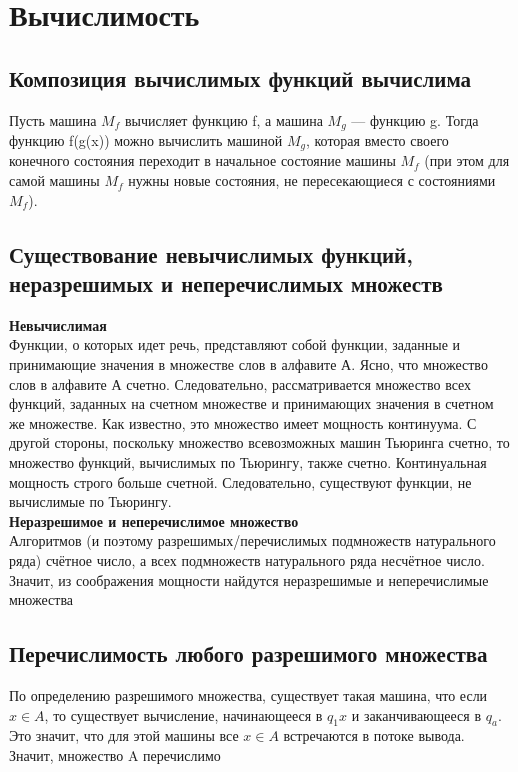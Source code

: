 \section{Вычислимость}

\subsection{Композиция вычислимых функций вычислима}
Пусть машина $M_f$ вычисляет функцию f, а машина $M_g$ — функцию g. Тогда функцию f(g(x)) можно вычислить машиной $M_g$, которая вместо своего конечного
состояния переходит в начальное состояние машины $M_f$ (при этом для самой машины
$M_f$ нужны новые состояния, не пересекающиеся с состояниями $M_f$).

\subsection{Существование невычислимых функций, неразрешимых и неперечислимых множеств}
\textbf{Невычислимая}\\
Функции, о которых идет речь, представляют собой функции, заданные и принимающие значения в множестве слов в алфавите А. Ясно, что множество слов в алфавите А счетно. Следовательно, рассматривается множество всех функций, заданных на счетном множестве и принимающих значения в счетном же множестве. Как известно, это множество имеет мощность континуума. С другой стороны, поскольку множество всевозможных машин Тьюринга счетно, то множество функций, вычислимых по Тьюрингу, также счетно. Континуальная мощность строго больше счетной. Следовательно, существуют функции, не вычислимые по Тьюрингу.
\\
\textbf{Неразрешимое и неперечислимое множество}\\
Алгоритмов (и поэтому разрешимых/перечислимых подмножеств натурального ряда) счётное число, а всех подмножеств натурального ряда несчётное число. Значит, из соображения мощности найдутся неразрешимые и неперечислимые множества

\subsection{Перечислимость любого разрешимого множества}
По определению разрешимого множества, существует такая машина, что если $x \in A$, то существует вычисление, начинающееся в $q_1x$ и заканчивающееся в $q_a$. Это значит, что для этой машины все $x \in A$ встречаются в потоке вывода. Значит, множество A перечислимо

